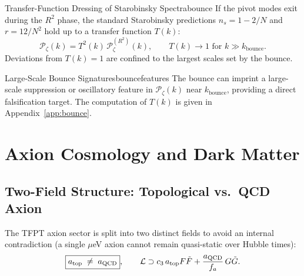 \begin{theorem}{Transfer-Function Dressing of Starobinsky Spectra}{bounce}
If the pivot modes exit during the $R^2$ phase, the standard Starobinsky
predictions
$n_s = 1 - 2/N$ and $r = 12/N^2$ hold up to a transfer function $T(k)$:
\begin{equation}
    \mathcal{P}_\zeta(k) = T^2(k)\,\mathcal{P}_\zeta^{(R^2)}(k),
    \qquad T(k)\to 1 \text{ for } k \gg k_{\text{bounce}}.
\end{equation}
Deviations from $T(k)=1$ are confined to the largest scales set by the bounce.
\end{theorem}

\begin{corollary}{Large-Scale Bounce Signatures}{bouncefeatures}
The bounce can imprint a large-scale suppression or oscillatory feature in
$\mathcal{P}_\zeta(k)$ near $k_{\text{bounce}}$, providing a direct falsification
target. The computation of $T(k)$ is given in Appendix~\ref{app:bounce}.
\end{corollary}

\TFPTTransferFunctionPlot



\section{Axion Cosmology and Dark Matter}

\subsection{Two-Field Structure: Topological vs.\ QCD Axion}

The TFPT axion sector is split into two distinct fields to avoid an internal
contradiction (a single $\mu$eV axion cannot remain quasi-static over Hubble times):
\begin{equation}
    \boxed{a_{\text{top}} \;\neq\; a_{\text{QCD}}},
    \qquad
    \mathcal{L} \supset c_3\, a_{\text{top}} F\tilde{F}
    + \frac{a_{\text{QCD}}}{f_a}\,G\tilde{G}.
\end{equation}

